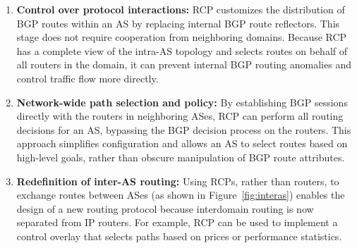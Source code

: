 \begin{enumerate}
\itemsep=-1pt
\item \textbf{Control over protocol interactions:} RCP customizes the
distribution of BGP routes within an AS by replacing internal BGP route
reflectors.  This stage does not require cooperation from
neighboring domains.  Because RCP has a complete view of the intra-AS
topology and selects routes on behalf of all routers in the domain, it
can prevent internal BGP routing anomalies and control 
traffic flow more directly.

\item \textbf{Network-wide path selection and policy:} By establishing
BGP sessions
directly with the routers in neighboring ASes, RCP can perform all
routing decisions for an AS, bypassing the BGP decision
process on the routers.  This approach simplifies configuration and allows an
AS to select routes based on high-level goals, rather than obscure
manipulation of BGP route attributes.

\item \textbf{Redefinition of inter-AS routing:} Using RCPs, rather than
routers, to exchange routes between ASes (as shown in
Figure~\ref{fig:interas}) enables the design of a new routing protocol
because interdomain routing is now separated from IP routers.  For
example, RCP can be used to implement a control overlay that selects
paths based on prices or performance statistics.
\end{enumerate}
\noindent


